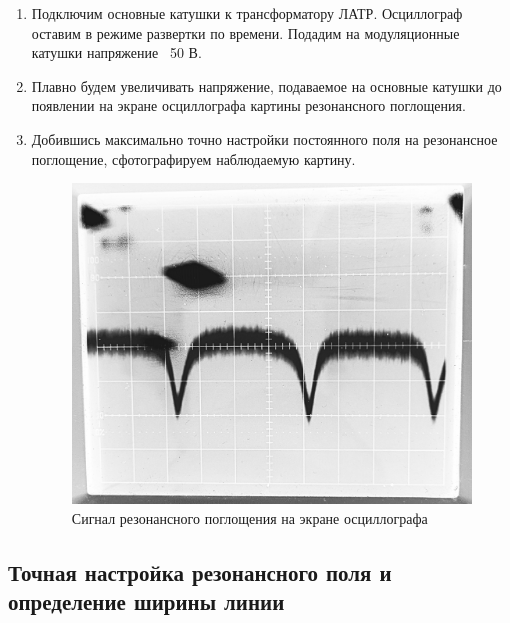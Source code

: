 \documentclass[14pt, a4paper]{report}
\begin{document}
\begin{enumerate}

\item Подключим основные катушки к трансформатору ЛАТР. Осциллограф оставим в режиме развертки по времени. Подадим на модуляционные катушки напряжение ~50 В. 

\item Плавно будем увеличивать напряжение, подаваемое на основные катушки до появлении на экране осциллографа картины резонансного поглощения.

\item Добившись максимально точно настройки постоянного поля на резонансное поглощение, сфотографируем наблюдаемую картину.

\begin{figure}[H]
\centering
\includegraphics[width=.8\linewidth]{../images/5101-4}
\caption{Сигнал резонансного поглощения на экране осциллографа}
\end{figure}

\end{enumerate}

\subsection{Точная настройка резонансного поля и определение ширины линии}
\end{document}
